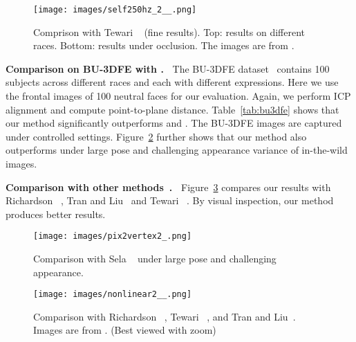 \documentclass[10pt,twocolumn,letterpaper]{article}
\begin{document}
\begin{figure}
	\texttt{[image: images/self250hz\_2\_\_.png]}
	\caption{Comprison with Tewari \etal~\cite{tewari2018self} (fine results). Top: results on different races. Bottom: results under occlusion. The images are from \cite{tewari2018self}.
	}\label{fig:quality_250hz}
	\vspace{-2pt}
\end{figure}


\vspace{6pt}
\noindent\textbf{Comparison on BU-3DFE with \cite{sela2017unrestricted,feng2018joint}.~} 
The BU-3DFE dataset~\cite{yin20063d} contains 100 subjects across different races and each with different expressions. Here we use the frontal images of 100 neutral faces for our evaluation. Again, we perform ICP alignment and compute point-to-plane distance. Table~\ref{tab:bu3dfe} shows that our method significantly outperforms \cite{sela2017unrestricted} and \cite{feng2018joint}. The BU-3DFE images are captured under controlled settings. Figure~\ref{fig:quality_pix2v} further shows that our method also outperforms \cite{sela2017unrestricted} under large pose and challenging appearance variance of in-the-wild images.

\vspace{6pt}
\noindent\textbf{Comparison with other methods~\cite{richardson20163d,tran2018nonlinear}.~}
Figure~\ref{fig:quality_nonlinear} compares our results with Richardson \etal~\cite{richardson20163d}, Tran and Liu~\cite{tran2018nonlinear} and Tewari \etal~\cite{tewari2017mofa}. By visual inspection, our method produces better results.

\begin{figure}
	\centering
	\texttt{[image: images/pix2vertex2\_.png]}
	\caption{Comparison with Sela \etal~\cite{sela2017unrestricted} under large pose and challenging appearance.}\label{fig:quality_pix2v}
	\vspace{-1pt}
\end{figure}

\begin{figure}
	\centering
	\texttt{[image: images/nonlinear2\_\_.png]}
	\caption{Comparison with Richardson \etal~\cite{richardson20163d}, Tewari \etal~\cite{tewari2017mofa}, and Tran and Liu~\cite{tran2018nonlinear}. Images are from \cite{tran2018nonlinear}. (Best viewed with zoom)}\label{fig:quality_nonlinear}
	\vspace{-2pt}
\end{figure}
\end{document}
